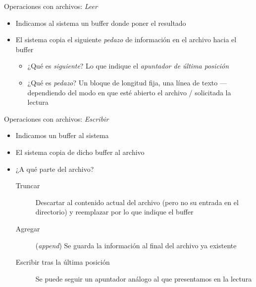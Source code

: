 \documentclass[presentation]{beamer}
\begin{document}
\begin{frame}[label={sec:org9c5ec26}]{Operaciones con archivos: \emph{Leer}}
\begin{itemize}
\item Indicamos al sistema un buffer donde poner el resultado
\item El sistema copia el siguiente \emph{pedazo} de información en el archivo
hacia el buffer
\begin{itemize}
\item ¿Qué es \emph{siguiente}?
\pause
Lo que indique el \emph{apuntador de última posición}
\item ¿Qué es \emph{pedazo}?
\pause
Un bloque de longitud fija, una línea de texto — dependiendo del
modo en que esté abierto el archivo / solicitada la lectura
\end{itemize}
\end{itemize}
\end{frame}

\begin{frame}[label={sec:org0385b79}]{Operaciones con archivos: \emph{Escribir}}
\begin{itemize}
\item Indicamos un buffer al sistema
\item El sistema copia de dicho buffer al archivo
\item ¿A qué parte del archivo?
\begin{description}
\item[{Truncar}] Descartar al contenido actual del archivo (pero no su
entrada en el directorio) y reemplazar por lo que
indique el buffer
\item[{Agregar}] (\emph{append}) Se guarda la información al final del
archivo ya existente
\item[{Escribir tras la última posición}] Se puede seguir un apuntador
análogo al que presentamos en la lectura
\end{description}
\end{itemize}
\end{frame}
\end{document}
